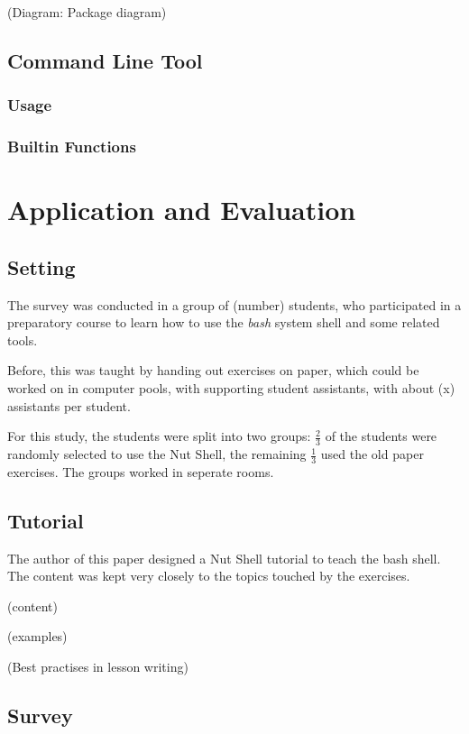 \documentclass[twoside,blue]{tubsreprt}
\begin{document}
(Diagram: Package diagram)

\section{Command Line Tool}

\subsection{Usage}

\subsection{Builtin Functions}

\chapter{Application and Evaluation}

\section{Setting}

The survey was conducted in a group of (number) students, who participated in a preparatory course to learn how to use the \emph{bash} system shell and some related tools.

Before, this was taught by handing out exercises on paper, which could be worked on in computer pools, with supporting student assistants, with about (x) assistants per student.

For this study, the students were split into two groups: $\frac{2}{3}$ of the students were randomly selected to use the Nut Shell, the remaining $\frac{1}{3}$ used the old paper exercises. The groups worked in seperate rooms.

\section{Tutorial}

The author of this paper designed a Nut Shell tutorial to teach the bash shell. The content was kept very closely to the topics touched by the exercises.

(content)

(examples)

(Best practises in lesson writing)

\section{Survey}
\end{document}
